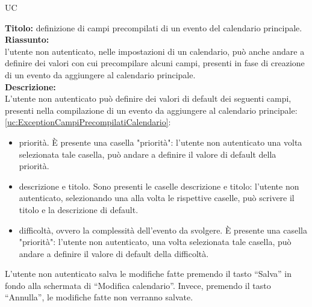 \begin{listaPersonale}{UC}
\begin{listaPersonale2}[UC] {}
            \textbf{Titolo: } definizione di campi precompilati di un evento del calendario principale. \\
            \textbf{Riassunto: } \\ l'utente non autenticato, nelle impostazioni di un calendario, può anche andare a definire dei valori con cui precompilare alcuni campi, presenti in fase di creazione di un evento da aggiungere al calendario principale. \\
            \textbf{Descrizione: } \\
            L'utente non autenticato può definire dei valori di default dei seguenti campi, presenti nella compilazione di un evento da aggiungere al calendario principale: \ref{uc:ExceptionCampiPrecompilatiCalendario}:
            \begin{itemize}
                \item priorità. È presente una casella "priorità": l'utente non autenticato una volta selezionata tale casella, può andare a definire il valore di default della priorità.
                \item descrizione e titolo. Sono presenti le caselle descrizione e titolo: l'utente non autenticato, selezionando una alla volta le rispettive caselle, può scrivere il titolo e la descrizione di default.
                \item difficoltà, ovvero la complessità dell'evento da svolgere. È presente una casella "priorità": l'utente non autenticato, una volta selezionata tale casella, può andare a definire il valore di default della difficoltà.
            \end{itemize}
            L'utente non autenticato salva le modifiche fatte premendo il tasto “Salva” in fondo alla schermata di “Modifica calendario”. Invece, premendo il tasto “Annulla”, le modifiche fatte non verranno salvate.


\end{listaPersonale2}
\end{listaPersonale}

